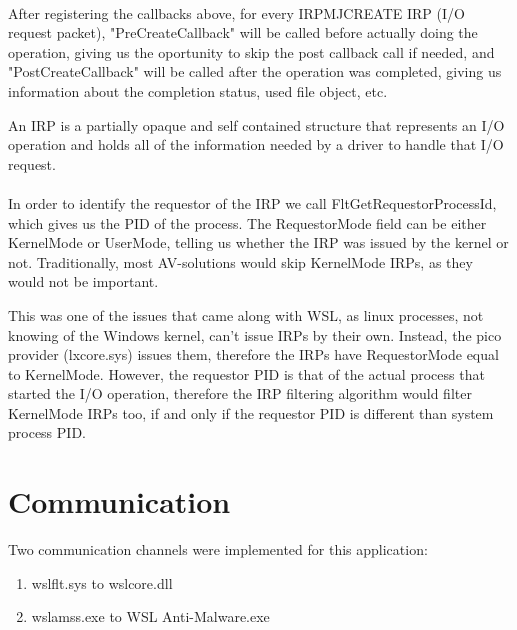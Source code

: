     \paragraph{}
    After registering the callbacks above, for every IRP\textunderscore MJ\textunderscore CREATE IRP (I/O request packet), "PreCreateCallback"
    will be called before actually doing the operation, giving us the oportunity to skip the post callback call if needed, and
    "PostCreateCallback" will be called after the operation was completed, giving us information about the completion status, used file object,
    etc.

    An IRP is a partially opaque and self contained structure that represents an I/O operation and holds all of the information needed by
    a driver to handle that I/O request.

    \paragraph{}
    In order to identify the requestor of the IRP we call FltGetRequestorProcessId, which gives us the PID of the process. The RequestorMode
    field can be either KernelMode or UserMode, telling us whether the IRP was issued by the kernel or not. Traditionally, most AV-solutions
    would skip KernelMode IRPs, as they would not be important.
    
    This was one of the issues that came along with WSL, as linux processes, not knowing of the Windows kernel, can't issue IRPs by their own.
    Instead, the pico provider (lxcore.sys) issues them, therefore the IRPs have  RequestorMode equal to KernelMode. However, the requestor PID
    is that of the actual process that started the I/O operation, therefore the IRP filtering algorithm would filter KernelMode IRPs too, if
    and only if the requestor PID is different than system process PID.

    \paragraph{}


    \pagebreak

    \section{Communication}
        
        Two communication channels were implemented for this application:
        \begin{enumerate}
            \item wslflt.sys to wslcore.dll
            \item wslamss.exe to WSL Anti-Malware.exe
        \end{enumerate}

